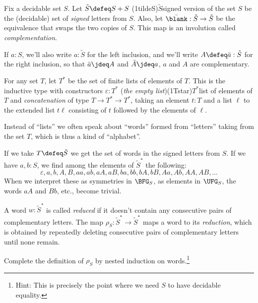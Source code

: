 \begin{definition}
  Fix a decidable set $S$. Let $\tilde S \defeq S + S$%
  \glossary(1tildeS){$\tilde S$}{signed version of the set $S$}
  be the (decidable) set of \emph{signed} letters from $S$.
  Also, let $\bar{\blank} : \tilde S \to \tilde S$
  be the equivalence that swaps the two copies of $S$.
  This map is an involution called \emph{complementation}.
\end{definition}

If $a:S$, we'll also write $a:\tilde S$ for the left inclusion,
and we'll write $A\defeq\bar a:\tilde S$ for the right inclusion,
so that $\bar a \jdeq A$ and $\bar A \jdeq a$, \ie $a$ and $A$ are complementary.

\begin{definition}
  For any set $T$, let $T^*$ be the set of finite lists of elements of $T$.
  This is the inductive type with constructors $\varepsilon : T^*$
  (\emph{the empty list})\glossary(1Tstar){$T^*$}{list of elements of $T$}%
  and \emph{concatenation} of type $T \to T^* \to T^*$,
  taking an element $t:T$ and a list $\ell$ to the extended list $t\ell$
  consisting of $t$ followed by the elements of $\ell$.
\end{definition}
Instead of ``lists'' we often speak about ``words'' formed from ``letters''
taking from the set $T$, which is thus a kind of ``alphabet''.

If we take $T \defeq \tilde S$ we get the set of words in the signed letters from $S$. If we have $a,b:S$, we find among the elements of $\tilde S^*$ the following:
\[
  \varepsilon,a,b,A,B,aa,ab,aA,aB,ba,bb,bA,bB,Aa,Ab,AA,AB,\ldots
\]
When we interpret these as symmetries in $\BFG_S$, \ie as elements in $\UFG_S$,
the words $aA$ and $Bb$, etc., become trivial.
\begin{definition}
  A word $w : \tilde S^*$ is called \emph{reduced}
  if it doesn't contain any consecutive pairs of complementary letters.
  The map $\rho_S : \tilde S^* \to \tilde S^*$ maps a word to its \emph{reduction},
  which is obtained by repeatedly deleting consecutive pairs of complementary
  letters until none remain.
\end{definition}

\begin{xca}
  Complete the definition of $\rho_S$ by nested induction on words.\footnote{%
    Hint: This is precisely the point where we need $S$ to have decidable equality.}
\end{xca}

